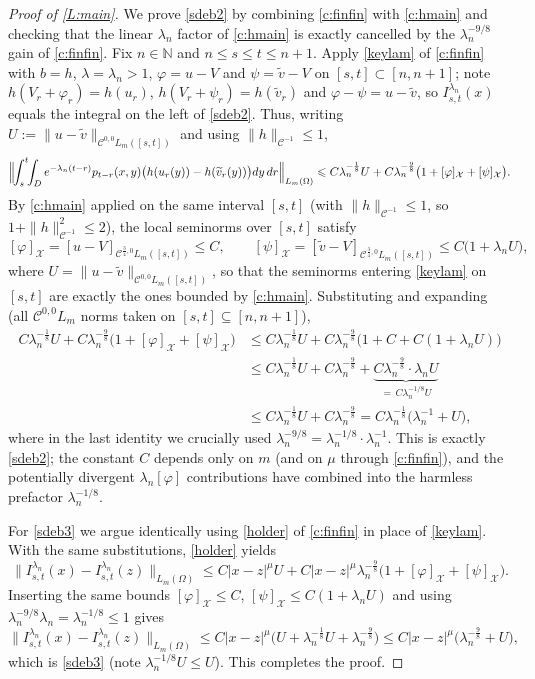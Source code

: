 \documentclass[12pt]{article}
\theoremstyle{definition}
\DeclareMathOperator{\1}{\mathbbm{1}}%
\def\phi{\varphi}
\renewcommand{\le}{\leqslant}
\newcommand{\wt}{\widetilde}
\newcommand{\C}{\mathcal{C}}
\newcommand{\N}{\mathbb{N}}
\newcommand{\X}{\mathcal{X}}
\begin{document}
\begin{proof}[Proof of \cref{L:main}]
We prove \eqref{sdeb2} by combining \cref{c:finfin} with \cref{c:hmain} and
checking that the linear $\lambda_n$ factor of \cref{c:hmain} is exactly
cancelled by the $\lambda_n^{-9/8}$ gain of \cref{c:finfin}. Fix $n\in\N$ and
$n\le s\le t\le n+1$. Apply \eqref{keylam} of \cref{c:finfin} with $b=h$,
$\lambda=\lambda_n>1$, $\phi=u-V$ and $\psi=\wt v-V$ on $[s,t]\subset[n,n+1]$;
note $h(V_r+\phi_r)=h(u_r)$, $h(V_r+\psi_r)=h(\wt v_r)$ and $\phi-\psi=u-\wt v$,
so $I^{\lambda_n}_{s,t}(x)$ equals the integral on the left of \eqref{sdeb2}.
Thus, writing $U:=\|u-\wt v\|_{\C^{0,0}L_m([s,t])}$ and using $\|h\|_{\C^{-1}}\le1$,
\[
\Bigl\|\!\int_s^t\!\!\int_D e^{-\lambda_n(t-r)}p_{t-r}(x,y)\bigl(h(u_r(y))-h(\wt v_r(y))\bigr)dy\,dr\Bigr\|_{L_m(\Omega)}
\le C\lambda_n^{-\frac18}U+C\lambda_n^{-\frac98}\bigl(1+[\phi]_{\X}+[\psi]_{\X}\bigr).
\]
By \cref{c:hmain} applied on the same interval $[s,t]$ (with $\|h\|_{\C^{-1}}\le1$, so
$1+\|h\|_{\C^{-1}}^2\le2$), the local seminorms over $[s,t]$ satisfy
\[
[\phi]_{\X}=[u-V]_{\C^{\frac34,0}L_m([s,t])}\le C,\qquad
[\psi]_{\X}=[\wt v-V]_{\C^{\frac34,0}L_m([s,t])}\le C\bigl(1+\lambda_n U\bigr),
\]
where $U=\|u-\wt v\|_{\C^{0,0}L_m([s,t])}$, so that the seminorms entering \eqref{keylam}
on $[s,t]$ are exactly the ones bounded by \cref{c:hmain}.
Substituting and expanding (all $\C^{0,0}L_m$ norms taken on $[s,t]\subseteq[n,n+1]$),
\begin{align*}
C\lambda_n^{-\frac18}U+C\lambda_n^{-\frac98}\bigl(1+[\phi]_{\X}+[\psi]_{\X}\bigr)
&\le C\lambda_n^{-\frac18}U+C\lambda_n^{-\frac98}\bigl(1+C+C(1+\lambda_n U)\bigr)\\
&\le C\lambda_n^{-\frac18}U+C\lambda_n^{-\frac98}+\underbrace{C\lambda_n^{-\frac98}\cdot\lambda_n U}_{=\,C\lambda_n^{-1/8}U}\\
&\le C\lambda_n^{-\frac18}U+C\lambda_n^{-\frac98}
= C\lambda_n^{-\frac18}\bigl(\lambda_n^{-1}+U\bigr),
\end{align*}
where in the last identity we crucially used $\lambda_n^{-9/8}=\lambda_n^{-1/8}\cdot\lambda_n^{-1}$.
This is exactly \eqref{sdeb2}; the constant $C$ depends only on $m$ (and on
$\mu$ through \cref{c:finfin}), and the potentially divergent $\lambda_n[\phi]$
contributions have combined into the harmless prefactor $\lambda_n^{-1/8}$.

For \eqref{sdeb3} we argue identically using \eqref{holder} of \cref{c:finfin}
in place of \eqref{keylam}. With the same substitutions, \eqref{holder} yields
\[
\|I^{\lambda_n}_{s,t}(x)-I^{\lambda_n}_{s,t}(z)\|_{L_m(\Omega)}
\le C|x-z|^{\mu}U+C|x-z|^{\mu}\lambda_n^{-\frac98}\bigl(1+[\phi]_{\X}+[\psi]_{\X}\bigr).
\]
Inserting the same bounds $[\phi]_{\X}\le C$, $[\psi]_{\X}\le C(1+\lambda_n U)$ and
using $\lambda_n^{-9/8}\lambda_n=\lambda_n^{-1/8}\le1$ gives
\[
\|I^{\lambda_n}_{s,t}(x)-I^{\lambda_n}_{s,t}(z)\|_{L_m(\Omega)}
\le C|x-z|^{\mu}\bigl(U+\lambda_n^{-\frac18}U+\lambda_n^{-\frac98}\bigr)
\le C|x-z|^{\mu}\bigl(\lambda_n^{-\frac98}+U\bigr),
\]
which is \eqref{sdeb3} (note $\lambda_n^{-1/8}U\le U$). This completes the proof.
\end{proof}
\end{document}
